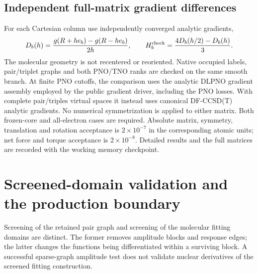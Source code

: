 \documentclass[11pt]{article}
\begin{document}
\subsection{Independent full-matrix gradient differences}
For each Cartesian column use independently converged analytic gradients,
\begin{equation}
 D_b(h)=\frac{g(R+h e_b)-g(R-h e_b)}{2h},\qquad
 H_b^{\rm check}=\frac{4D_b(h/2)-D_b(h)}{3}.
\end{equation}
The molecular geometry is not recentered or reoriented. Native occupied
labels, pair/triplet graphs and both PNO/TNO ranks are checked on the same
smooth branch. At finite PNO cutoffs, the comparison uses the analytic
DLPNO gradient assembly employed by the public gradient driver, including
the PNO losses. With complete pair/triples virtual spaces it instead uses
canonical DF-CCSD(T) analytic gradients. No numerical symmetrization is
applied to either matrix. Both frozen-core and all-electron cases are
required. Absolute matrix, symmetry, translation and rotation acceptance
is $2\times10^{-7}$ in the corresponding atomic units; net force and
torque acceptance is $2\times10^{-8}$. Detailed results and the full matrices
are recorded with the working memory checkpoint.

\section{Screened-domain validation and the production boundary}
\label{sec:screened-domain-audit}
Screening of the retained pair graph and screening of the molecular fitting
domains are distinct. The former removes amplitude blocks and response edges;
the latter changes the functions being differentiated within a surviving block.
A successful sparse-graph amplitude test does not validate nuclear derivatives
of the screened fitting construction.
\end{document}
